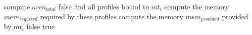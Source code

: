 \setlength{\textfloatsep}{0.2cm}
\begin{algorithm2e}[h]
		compute $area_{total}$\;
		{
			\Return false\;
		}
		{
				{
					find all profiles bound to $mt_{i}$\;
					compute the memory $mem_{required}$ required by these profiles\;
					compute the memory $mem_{provided}$ provided by $mt_{i}$\;
					{
						\Return false\;
					}
				}
				\Return true\;
		}
	\caption{$ConstraintsCheck()$}
	\label{algo:constrain_check_1}
\end{algorithm2e}
\setlength{\textfloatsep}{0.2cm}